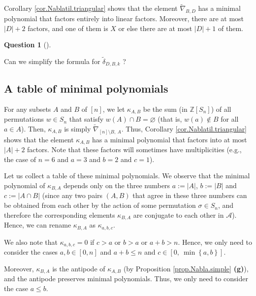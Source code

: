 \documentclass[numbers=enddot,12pt,final,onecolumn,notitlepage]{scrartcl}%
\numberwithin{exer}{subsection}
\theoremstyle{definition}
\newtheorem{quest}[theo]{Question}
\newenvironment{question}[1][]
{\begin{quest}[#1]\begin{leftbar}}
{\end{leftbar}\end{quest}}
\newenvironment{question}[1][Question]{\noindent\textbf{#1.} }{\ \rule{0.5em}{0.5em}}
\begin{document}
Corollary \ref{cor.Nablatil.triangular} shows that the element
$\widetilde{\nabla}_{B,D}$ has a minimal polynomial that factors entirely into
linear factors. Moreover, there are at most $\left\vert D\right\vert +2$
factors, and one of them is $X$ or else there are at most $\left\vert
D\right\vert +1$ of them.

\begin{question}
Can we simplify the formula for $\widetilde{\delta}_{D,B,k}$ ?
\end{question}

\subsection{A table of minimal polynomials}

For any subsets $A$ and $B$ of $\left[  n\right]  $, we let $\kappa_{A,B}$ be
the sum (in $\mathbb{Z}\left[  S_{n}\right]  $) of all permutations $w\in
S_{n}$ that satisfy $w\left(  A\right)  \cap B=\varnothing$ (that is,
$w\left(  a\right)  \notin B$ for all $a\in A$). Then, $\kappa_{A,B}$ is
simply $\widetilde{\nabla}_{\left[  n\right]  \setminus B,\ A}$. Thus,
Corollary \ref{cor.Nablatil.triangular} shows that the element $\kappa_{A,B}$
has a minimal polynomial that factors into at most $\left\vert A\right\vert
+2$ factors. Note that these factors will sometimes have multiplicities (e.g.,
the case of $n=6$ and $a=3$ and $b=2$ and $c=1$).

Let us collect a table of these minimal polynomials. We observe that the
minimal polynomial of $\kappa_{B,A}$ depends only on the three numbers
$a:=\left\vert A\right\vert $, $b:=\left\vert B\right\vert $ and
$c:=\left\vert A\cap B\right\vert $ (since any two pairs $\left(  A,B\right)
$ that agree in these three numbers can be obtained from each other by the
action of some permutation $\sigma\in S_{n}$, and therefore the corresponding
elements $\kappa_{B,A}$ are conjugate to each other in $\mathcal{A}$). Hence,
we can rename $\kappa_{B,A}$ as $\kappa_{a,b,c}$.

We also note that $\kappa_{a,b,c}=0$ if $c>a$ or $b>a$ or $a+b>n$. Hence, we
only need to consider the cases $a,b\in\left[  0,n\right]  $ and $a+b\leq n$
and $c\in\left[  0,\ \min\left\{  a,b\right\}  \right]  $.

Moreover, $\kappa_{B,A}$ is the antipode of $\kappa_{A,B}$ (by Proposition
\ref{prop.Nabla.simple} \textbf{(g)}), and the antipode preserves minimal
polynomials. Thus, we only need to consider the case $a\leq b$.
\end{document}
